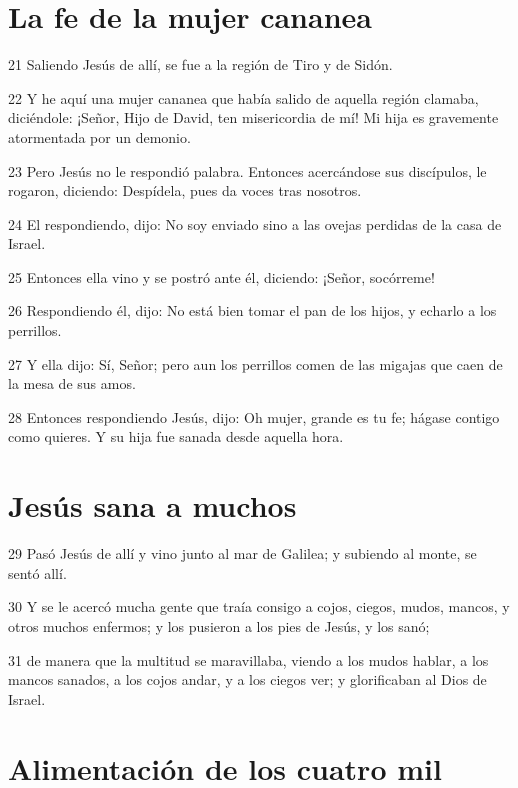 \section*{La fe de la mujer cananea}

\par 21 Saliendo Jesús de allí, se fue a la región de Tiro y de Sidón.
\par 22 Y he aquí una mujer cananea que había salido de aquella región clamaba, diciéndole: ¡Señor, Hijo de David, ten misericordia de mí! Mi hija es gravemente atormentada por un demonio.
\par 23 Pero Jesús no le respondió palabra. Entonces acercándose sus discípulos, le rogaron, diciendo: Despídela, pues da voces tras nosotros.
\par 24 El respondiendo, dijo: No soy enviado sino a las ovejas perdidas de la casa de Israel.
\par 25 Entonces ella vino y se postró ante él, diciendo: ¡Señor, socórreme!
\par 26 Respondiendo él, dijo: No está bien tomar el pan de los hijos, y echarlo a los perrillos.
\par 27 Y ella dijo: Sí, Señor; pero aun los perrillos comen de las migajas que caen de la mesa de sus amos.
\par 28 Entonces respondiendo Jesús, dijo: Oh mujer, grande es tu fe; hágase contigo como quieres. Y su hija fue sanada desde aquella hora.

\section*{Jesús sana a muchos}

\par 29 Pasó Jesús de allí y vino junto al mar de Galilea; y subiendo al monte, se sentó allí.
\par 30 Y se le acercó mucha gente que traía consigo a cojos, ciegos, mudos, mancos, y otros muchos enfermos; y los pusieron a los pies de Jesús, y los sanó;
\par 31 de manera que la multitud se maravillaba, viendo a los mudos hablar, a los mancos sanados, a los cojos andar, y a los ciegos ver; y glorificaban al Dios de Israel.

\section*{Alimentación de los cuatro mil}

